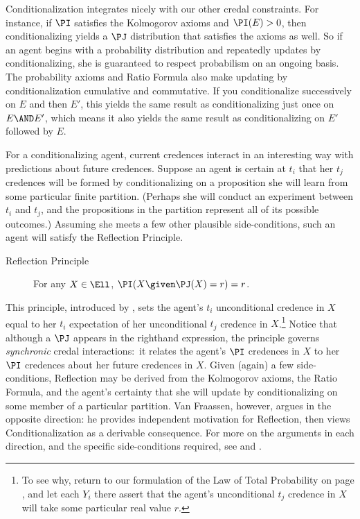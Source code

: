 Conditionalization integrates nicely with our other credal constraints. For instance, if $\PI$ satisfies the Kolmogorov axioms and $\PI(E)>0$, then conditionalizing yields a $\PJ$ distribution that satisfies the axioms as well. So if an agent begins with a probability distribution and repeatedly updates by conditionalizing, she is guaranteed to respect probabilism on an ongoing basis. The probability axioms and Ratio Formula also make updating by conditionalization cumulative and commutative. If you conditionalize successively on $E$ and then $E'$, this yields the same result as conditionalizing just once on $E \AND E'$, which means it also yields the same result as conditionalizing on $E'$ followed by $E$.      

For a conditionalizing agent, current credences interact in an interesting way with predictions about future credences. Suppose an agent is certain at $t_i$ that her $t_j$ credences will be formed by conditionalizing on a proposition she will learn from some particular finite partition. (Perhaps she will conduct an experiment between $t_i$ and $t_j$, and the propositions in the partition represent all of its possible outcomes.) Assuming she meets a few other plausible side-conditions, such an agent will satisfy the Reflection Principle.
\begin{description}
\item[Reflection Principle]{For any $X \in \Ell$, $\PI(X \given \PJ(X)=r)=r$.} 
\end{description}
This principle, introduced by \citet{vanFraassenWill}, sets the agent's $t_i$ unconditional credence in $X$ equal to her $t_i$ expectation of her unconditional $t_j$ credence in $X$.\footnote
{To see why, return to our formulation of the Law of Total Probability on page \pageref{p:LTP}, and let each $Y_i$ there assert that the agent's unconditional $t_j$ credence in $X$ will take some particular real value $r$.}
 Notice that although a $\PJ$ appears in the righthand expression, the principle governs \emph{synchronic} credal interactions:\ it relates the agent's $\PI$ credences in $X$ to her $\PI$ credences about her future credences in $X$. Given (again) a few side-conditions, Reflection may be derived from the Kolmogorov axioms, the Ratio Formula, and the agent's certainty that she will update by conditionalizing on some member of a particular partition. Van Fraassen, however, argues in the opposite direction: he provides independent motivation for Reflection, then views Conditionalization as a derivable consequence. For more on the arguments in each direction, and the specific side-conditions required, see \citet{WeisbergConditionalization} and \citet{BriggsDistorted}.

